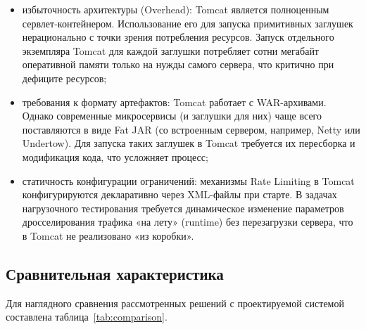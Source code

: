 \begin{itemize}
\item избыточность архитектуры (Overhead): Tomcat является полноценным сервлет-контейнером. Использование его для запуска примитивных заглушек нерационально с точки зрения потребления ресурсов. Запуск отдельного экземпляра Tomcat для каждой заглушки потребляет сотни мегабайт оперативной памяти только на нужды самого сервера, что критично при дефиците ресурсов;
\item требования к формату артефактов: Tomcat работает с WAR-архивами. Однако современные микросервисы (и заглушки для них) чаще всего поставляются в виде Fat JAR (со встроенным сервером, например, Netty или Undertow). Для запуска таких заглушек в Tomcat требуется их пересборка и модификация кода, что усложняет процесс;
\item статичность конфигурации ограничений: механизмы Rate Limiting в Tomcat конфигурируются декларативно через XML-файлы при старте. В задачах нагрузочного тестирования требуется динамическое изменение параметров дросселирования трафика «на лету» (runtime) без перезагрузки сервера, что в Tomcat не реализовано «из коробки».
\end{itemize}

\subsection{Сравнительная характеристика}

Для наглядного сравнения рассмотренных решений с проектируемой системой составлена таблица~\ref{tab:comparison}.




